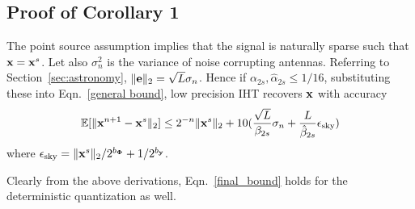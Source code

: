 \documentclass[aoas,preprint]{imsart}
\numberwithin{equation}{section}
\theoremstyle{plain}
\begin{document}
{\subsection{Proof of Corollary 1}
The point source assumption implies that the signal is naturally sparse such that ${\bf x} = {\bf x}^s$. Let also $\sigma_n^2$ is the variance of noise corrupting antennas. Referring to Section~\ref{sec:astronomy}, $\|{\bf e} \|_2 = \sqrt{L}\sigma_n$. Hence if $\alpha_{2s}, \hat{\alpha}_{2s}\leq 1/16$, substituting these into Eqn.~\ref{general bound}, low precision IHT recovers ${\bf x}$ with accuracy
\begin{equation}\label{final_bound}
    \mathbb{E}[\|{\bf x}^{n+1} - {\bf x}^s \|_2] \leq 2^{-n}\| {\bf x}^s\|_2 + 10(\frac{\sqrt{L}}{\beta_{2s}}\sigma_n+\frac{L}{\hat{\beta}_{2s}}\epsilon_{\rm{sky}})
\end{equation}
where $\epsilon_{\rm{sky}} =  \|{\bf x}^s \|_2/2^{b_{\bf \Phi}} + 1/2^{b_{\bf y}}$.
\begin{remark}
Clearly from the above derivations, Eqn.~\ref{final_bound} holds for the deterministic quantization as well.
\end{remark}
}
\end{document}
